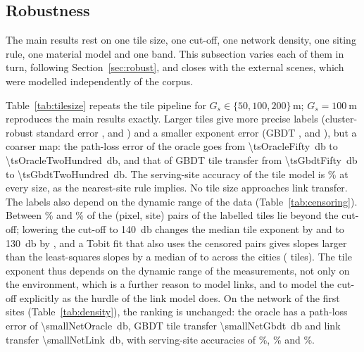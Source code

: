 \subsection{Robustness}
\label{sec:res-robust}

The main results rest on one tile size, one cut-off, one network density,
one siting rule, one material model and one band. This subsection varies
each of them in turn, following Section~\ref{sec:robust}, and closes with
the external scenes, which were modelled independently of the corpus.

Table~\ref{tab:tilesize} repeats the tile pipeline for
$G_s\in\{50,100,200\}$\,m; $G_s=\SI{100}{\metre}$ reproduces the main
results exactly. Larger tiles give more precise labels (cluster-robust
standard error \tsSeFifty, \tsSeHundred{} and \tsSeTwoHundred) and a smaller
exponent error (GBDT \tsGammaFifty, \tsGammaHundred{} and \tsGammaTwoHundred),
but a coarser map: the path-loss error of the oracle goes from
\SI{\tsOracleFifty}{\decibel} to \SI{\tsOracleTwoHundred}{\decibel}, and that
of GBDT tile transfer from \SI{\tsGbdtFifty}{\decibel} to
\SI{\tsGbdtTwoHundred}{\decibel}. The serving-site accuracy of the tile model
is \tsAssocRange\% at every size, as the nearest-site rule implies. No tile
size approaches link transfer. The labels also depend on the dynamic range
of the data (Table~\ref{tab:censoring}). Between \censMin\% and \censMax\%
of the (pixel, site) pairs of the labelled tiles lie beyond the cut-off;
lowering the cut-off to \SI{140}{\decibel} changes the median tile exponent
by \censDgOneForty{} and to \SI{130}{\decibel} by \censDgOneThirty, and a
Tobit fit that also uses the censored pairs gives slopes larger than the
least-squares slopes by a median of \censTobitMin{} to \censTobitMax{}
across the cities (\censTobitTiles{} tiles). The tile exponent thus
depends on the dynamic range of the measurements, not only on the
environment, which is a further reason to model links, and to model the
cut-off explicitly as the hurdle of the link model does. On the network of
the first \nSitesSmall{} sites (Table~\ref{tab:density}), the ranking is
unchanged: the oracle has a path-loss error of
\SI{\smallNetOracle}{\decibel}, GBDT tile transfer
\SI{\smallNetGbdt}{\decibel} and link transfer \SI{\smallNetLink}{\decibel},
with serving-site accuracies of \smallAssocOracle\%, \smallAssocGbdt\% and
\smallAssocLink\%.

\begin{table}[!tp]
\centering
\caption{Tile size. Tiles per city, median shrinkage weight (mean of the
city medians) and standard error of the exponent (iid and cluster-robust,
RMS over all tiles); zero-shot exponent RMSE of the source median and GBDT;
network path-loss RMSE of the tile labels (oracle) and of GBDT tile
transfer; serving-site accuracy of the tile model. Means over the held-out
cities.}
\label{tab:tilesize}
\small
%
\end{table}

